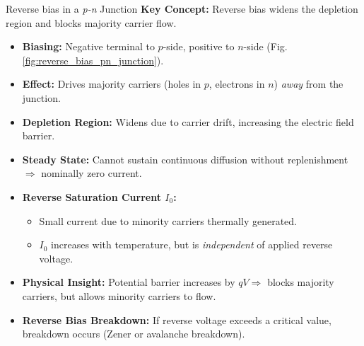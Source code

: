 
\begin{frame}{Reverse bias in a \textit{p-n} Junction}
    \textbf{Key Concept:} Reverse bias widens the depletion region and blocks majority carrier flow.
    \begin{itemize}
        \item \textbf{Biasing:} Negative terminal to $p$-side, positive to $n$-side (Fig. \ref{fig:reverse_bias_pn_junction}).
        \item \textbf{Effect:} Drives majority carriers (holes in $p$, electrons in $n$) \textit{away} from the junction.
        \item \textbf{Depletion Region:} Widens due to carrier drift, increasing the electric field barrier.
        \item \textbf{Steady State:} Cannot sustain continuous diffusion without replenishment $\Rightarrow$ nominally zero current.
        \item \textbf{Reverse Saturation Current $I_0$:}
        \begin{itemize}
            \item Small current due to minority carriers thermally generated.
            \item $I_0$ increases with temperature, but is \textit{independent} of applied reverse voltage.
        \end{itemize}
        \item \textbf{Physical Insight:} Potential barrier increases by $qV \Rightarrow$ blocks majority carriers, but allows minority carriers to flow.
		\item \textbf{Reverse Bias Breakdown:} If reverse voltage exceeds a critical value, breakdown occurs (Zener or avalanche breakdown).
    \end{itemize}
\end{frame}


